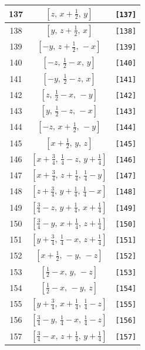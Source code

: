 \documentclass[fleqn,8pt]{jsarticle}
\begin{document}
\begin{longtable}{ccc}
137 & $\left[ z,\, x + \frac{1}{2},\, y \right]$ & {\tt [137]} \\ \hline
138 & $\left[ y,\, z + \frac{1}{2},\, x \right]$ & {\tt [138]} \\ \hline
139 & $\left[ - y,\, z + \frac{1}{2},\, - x \right]$ & {\tt [139]} \\ \hline
140 & $\left[ - z,\, \frac{1}{2} - x,\, y \right]$ & {\tt [140]} \\ \hline
141 & $\left[ - y,\, \frac{1}{2} - z,\, x \right]$ & {\tt [141]} \\ \hline
142 & $\left[ z,\, \frac{1}{2} - x,\, - y \right]$ & {\tt [142]} \\ \hline
143 & $\left[ y,\, \frac{1}{2} - z,\, - x \right]$ & {\tt [143]} \\ \hline
144 & $\left[ - z,\, x + \frac{1}{2},\, - y \right]$ & {\tt [144]} \\ \hline
145 & $\left[ x + \frac{1}{2},\, y,\, z \right]$ & {\tt [145]} \\ \hline
146 & $\left[ x + \frac{3}{4},\, \frac{1}{4} - z,\, y + \frac{1}{4} \right]$ & {\tt [146]} \\ \hline
147 & $\left[ x + \frac{3}{4},\, z + \frac{1}{4},\, \frac{1}{4} - y \right]$ & {\tt [147]} \\ \hline
148 & $\left[ z + \frac{3}{4},\, y + \frac{1}{4},\, \frac{1}{4} - x \right]$ & {\tt [148]} \\ \hline
149 & $\left[ \frac{3}{4} - z,\, y + \frac{1}{4},\, x + \frac{1}{4} \right]$ & {\tt [149]} \\ \hline
150 & $\left[ \frac{3}{4} - y,\, x + \frac{1}{4},\, z + \frac{1}{4} \right]$ & {\tt [150]} \\ \hline
151 & $\left[ y + \frac{3}{4},\, \frac{1}{4} - x,\, z + \frac{1}{4} \right]$ & {\tt [151]} \\ \hline
152 & $\left[ x + \frac{1}{2},\, - y,\, - z \right]$ & {\tt [152]} \\ \hline
153 & $\left[ \frac{1}{2} - x,\, y,\, - z \right]$ & {\tt [153]} \\ \hline
154 & $\left[ \frac{1}{2} - x,\, - y,\, z \right]$ & {\tt [154]} \\ \hline
155 & $\left[ y + \frac{3}{4},\, x + \frac{1}{4},\, \frac{1}{4} - z \right]$ & {\tt [155]} \\ \hline
156 & $\left[ \frac{3}{4} - y,\, \frac{1}{4} - x,\, \frac{1}{4} - z \right]$ & {\tt [156]} \\ \hline
157 & $\left[ \frac{3}{4} - x,\, z + \frac{1}{4},\, y + \frac{1}{4} \right]$ & {\tt [157]} \\ \hline

\end{longtable}
\end{document}
